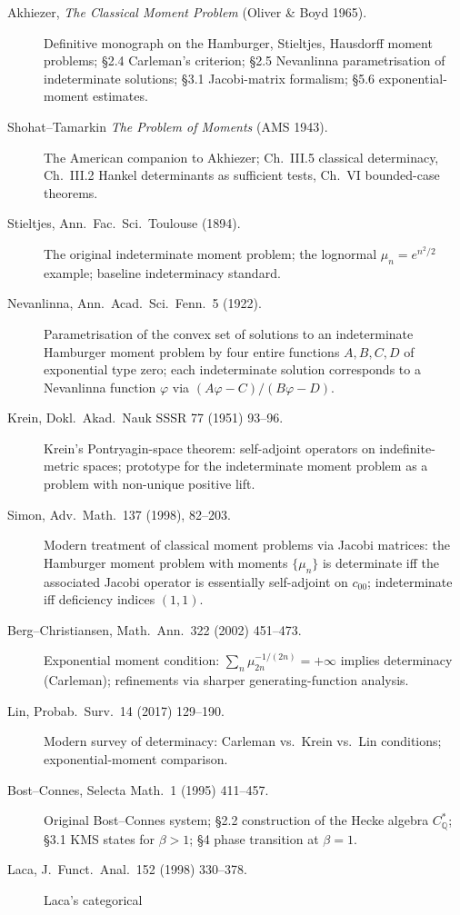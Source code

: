 \begin{description}
\item[Akhiezer, \emph{The Classical Moment Problem} (Oliver \& Boyd
1965).] Definitive monograph on the Hamburger, Stieltjes, Hausdorff
moment problems; \S2.4 Carleman's criterion; \S2.5 Nevanlinna
parametrisation of indeterminate solutions; \S3.1 Jacobi-matrix
formalism; \S5.6 exponential-moment estimates.
\item[Shohat--Tamarkin \emph{The Problem of Moments} (AMS 1943).] The
American companion to Akhiezer; Ch.~III.5 classical determinacy,
Ch.~III.2 Hankel determinants as sufficient tests, Ch.~VI bounded-case
theorems.
\item[Stieltjes, Ann.~Fac.~Sci.~Toulouse (1894).] The original
indeterminate moment problem; the lognormal \(\mu_{n}=e^{n^{2}/2}\)
example; baseline indeterminacy standard.
\item[Nevanlinna, Ann.~Acad.~Sci.~Fenn.~5 (1922).] Parametrisation of
the convex set of solutions to an indeterminate Hamburger moment
problem by four entire functions \(A,B,C,D\) of exponential type zero;
each indeterminate solution corresponds to a Nevanlinna function
\(\varphi\) via \((A\varphi-C)/(B\varphi-D)\).
\item[Krein, Dokl.~Akad.~Nauk SSSR 77 (1951) 93--96.] Krein's
Pontryagin-space theorem: self-adjoint operators on indefinite-metric
spaces; prototype for the indeterminate moment problem as a problem
with non-unique positive lift.
\item[Simon, Adv.~Math.~137 (1998), 82--203.] Modern treatment of
classical moment problems via Jacobi matrices: the Hamburger moment
problem with moments \(\{\mu_{n}\}\) is determinate iff the associated
Jacobi operator is essentially self-adjoint on \(c_{00}\); indeterminate
iff deficiency indices \((1,1)\).
\item[Berg--Christiansen, Math.~Ann.~322 (2002) 451--473.] Exponential
moment condition: \(\sum_{n}\mu_{2n}^{-1/(2n)}=+\infty\) implies
determinacy (Carleman); refinements via sharper generating-function
analysis.
\item[Lin, Probab.~Surv.~14 (2017) 129--190.] Modern survey of
determinacy: Carleman vs.~Krein vs.~Lin conditions; exponential-moment
comparison.
\item[Bost--Connes, Selecta Math.~1 (1995) 411--457.] Original
Bost--Connes system; \S2.2 construction of the Hecke algebra
\(C^{*}_{\mathbb{Q}}\); \S3.1 KMS states for \(\beta>1\); \S4 phase
transition at \(\beta=1\).
\item[Laca, J.~Funct.~Anal.~152 (1998) 330--378.] Laca's categorical

\end{description}
